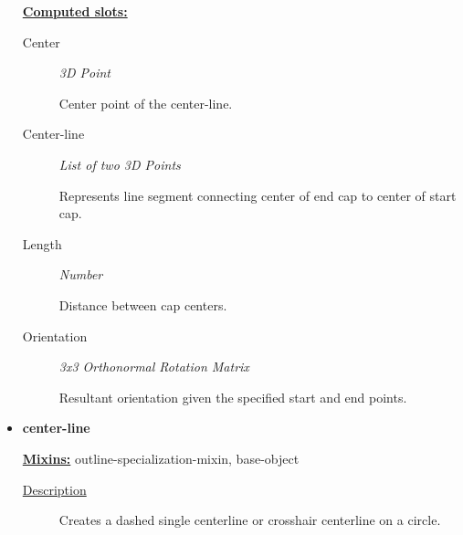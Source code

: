 \documentclass [11pt]{book}
\begin{document}
\begin{itemize}
\textbf{
\underline{Computed slots:}}

\begin{description}

\item [Center]
\emph{3D Point}

 Center point of the center-line.




\item [Center-line]
\emph{List of two 3D Points}

 Represents line segment connecting center of end cap to center of start cap.




\item [Length]
\emph{Number}

 Distance between cap centers.




\item [Orientation]
\emph{3x3 Orthonormal Rotation Matrix}

 Resultant orientation given the specified start and end points.




\end{description}







\item {}
\label{prim:center-line}
\textbf{center-line}


\textbf{
\underline{Mixins:}} outline-specialization-mixin, base-object





\begin{description}

\item [
\underline{Description}]


Creates a dashed single centerline or crosshair centerline on a circle.



\end{description}




\begin{figure}
\begin{lrbox}{\boxedverb}
\begin{minipage}{\linewidth}
{\small

}
\end{minipage}
\end{lrbox}
\end{figure}
\end{itemize}
\end{document}
